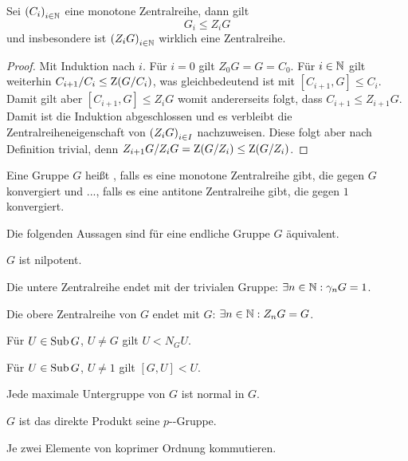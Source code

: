 \begin{lemma}
    Sei $\sequence{C_i}_{i\in\nats}$ eine monotone Zentralreihe, dann gilt
    $$
    G_i\leq Z_i G
    $$
    und insbesondere ist $\sequence{Z_i G}_{i\in\nats}$ wirklich eine Zentralreihe.
\end{lemma}

\begin{proof}
    Mit Induktion nach $i$. Für $i=0$ gilt $Z_0 G = G = C_0$. Für $i\in\mathbb{N}$ gilt weiterhin $C_{i+1}/C_i\leq\mathrm{Z} (G/C_i)$, was
    gleichbedeutend ist mit $[C_{i+1},G]\leq C_i$. Damit gilt aber $[C_{i+1},G]\leq Z_i G$ womit andererseits folgt, dass
    $C_{i+1}\leq Z_{i+1} G$. Damit ist die Induktion abgeschlossen und es verbleibt die Zentralreiheneigenschaft von $\sequence{Z_i
        G}_{i\in I}$ nachzuweisen. Diese folgt aber nach Definition trivial, denn $Z_{i+1} G/Z_i G=\mathrm{Z} (G/Z_i)\leq\mathrm{Z}(G/Z_i)$.
\end{proof}

\begin{definition}[Nilpotenz]
    Eine Gruppe $G$ heißt , falls es eine monotone Zentralreihe gibt, die gegen $G$ konvergiert und
    ..., falls es eine antitone Zentralreihe gibt, die gegen $1$ konvergiert. 
\end{definition}

\begin{theorem}
    Die folgenden Aussagen sind für eine endliche Gruppe $G$ äquivalent.
    \begin{statements}
            \item $G$ ist nilpotent.
            \item Die untere Zentralreihe endet mit der trivialen Gruppe: $\exists n\in\mathbb{N}:\gamma_n G = 1$.
            \item Die obere Zentralreihe von $G$ endet mit $G$: $\exists n\in\mathbb{N} : Z_n G = G$.
            \item Für $U\in\mathop{\mathrm{Sub}} G$, $U\neq G$ gilt $U<N_G U$.
            \item Für $U\in\mathop{\mathrm{Sub}} G$, $U\neq 1$ gilt $[G,U]<U$.
            \item Jede maximale Untergruppe von $G$ ist normal in $G$.
            \item $G$ ist das direkte Produkt seine $p$--Gruppe.
            \item Je zwei Elemente von koprimer Ordnung kommutieren.
    \end{statements}
\end{theorem}

